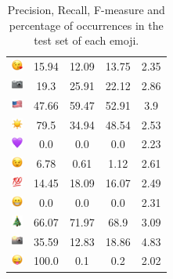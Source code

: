 \documentclass{article}
\begin{document}
\begin{table}
\begin{tabular}{|c|ccc|c|}
\includegraphics[height=0.37cm,width=0.37cm]{img/face_blowing_a_kiss.png} & 15.94 & 12.09 & 13.75 & 2.35\\ 
\includegraphics[height=0.37cm,width=0.37cm]{img/camera.png} & 19.3 & 25.91 & 22.12 & 2.86\\ 
\includegraphics[height=0.37cm,width=0.37cm]{img/United_States.png} & 47.66 & 59.47 & 52.91 & 3.9\\ 
\includegraphics[height=0.37cm,width=0.37cm]{img/sun.png} & 79.5 & 34.94 & 48.54 & 2.53\\ 
\includegraphics[height=0.37cm,width=0.37cm]{img/purple_heart.png} & 0.0 & 0.0 & 0.0 & 2.23\\ 
\includegraphics[height=0.37cm,width=0.37cm]{img/winking_face.png} & 6.78 & 0.61 & 1.12 & 2.61\\ 
\includegraphics[height=0.37cm,width=0.37cm]{img/hundred_points.png} & 14.45 & 18.09 & 16.07 & 2.49\\ 
\includegraphics[height=0.37cm,width=0.37cm]{img/beaming_face_with_smiling_eyes.png} & 0.0 & 0.0 & 0.0 & 2.31\\ 
\includegraphics[height=0.37cm,width=0.37cm]{img/Christmas_tree.png} & 66.07 & 71.97 & 68.9 & 3.09\\ 
\includegraphics[height=0.37cm,width=0.37cm]{img/camera_with_flash.png} & 35.59 & 12.83 & 18.86 & 4.83\\ 
\includegraphics[height=0.37cm,width=0.37cm]{img/winking_face_with_tongue.png} & 100.0 & 0.1 & 0.2 & 2.02\\ 

\hline
\end{tabular}
\caption{\label{table:emoji_detailed} Precision, Recall, F-measure and percentage of occurrences in the test set of each emoji.}
\end{table}
\end{document}
